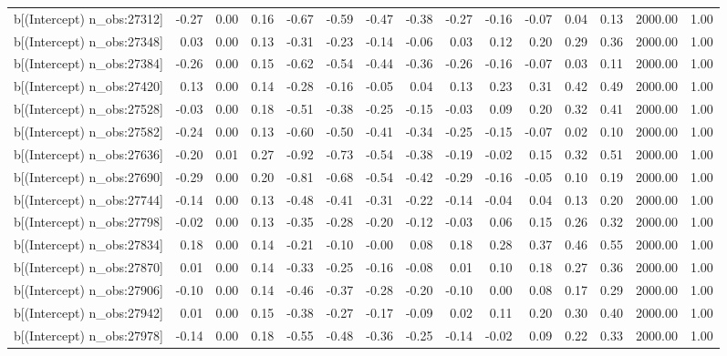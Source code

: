 \begin{table}[ht]
\begin{tabular}{rrrrrrrrrrrrrrr}
  b[(Intercept) n\_obs:27312] & -0.27 & 0.00 & 0.16 & -0.67 & -0.59 & -0.47 & -0.38 & -0.27 & -0.16 & -0.07 & 0.04 & 0.13 & 2000.00 & 1.00 \\ 
  b[(Intercept) n\_obs:27348] & 0.03 & 0.00 & 0.13 & -0.31 & -0.23 & -0.14 & -0.06 & 0.03 & 0.12 & 0.20 & 0.29 & 0.36 & 2000.00 & 1.00 \\ 
  b[(Intercept) n\_obs:27384] & -0.26 & 0.00 & 0.15 & -0.62 & -0.54 & -0.44 & -0.36 & -0.26 & -0.16 & -0.07 & 0.03 & 0.11 & 2000.00 & 1.00 \\ 
  b[(Intercept) n\_obs:27420] & 0.13 & 0.00 & 0.14 & -0.28 & -0.16 & -0.05 & 0.04 & 0.13 & 0.23 & 0.31 & 0.42 & 0.49 & 2000.00 & 1.00 \\ 
  b[(Intercept) n\_obs:27528] & -0.03 & 0.00 & 0.18 & -0.51 & -0.38 & -0.25 & -0.15 & -0.03 & 0.09 & 0.20 & 0.32 & 0.41 & 2000.00 & 1.00 \\ 
  b[(Intercept) n\_obs:27582] & -0.24 & 0.00 & 0.13 & -0.60 & -0.50 & -0.41 & -0.34 & -0.25 & -0.15 & -0.07 & 0.02 & 0.10 & 2000.00 & 1.00 \\ 
  b[(Intercept) n\_obs:27636] & -0.20 & 0.01 & 0.27 & -0.92 & -0.73 & -0.54 & -0.38 & -0.19 & -0.02 & 0.15 & 0.32 & 0.51 & 2000.00 & 1.00 \\ 
  b[(Intercept) n\_obs:27690] & -0.29 & 0.00 & 0.20 & -0.81 & -0.68 & -0.54 & -0.42 & -0.29 & -0.16 & -0.05 & 0.10 & 0.19 & 2000.00 & 1.00 \\ 
  b[(Intercept) n\_obs:27744] & -0.14 & 0.00 & 0.13 & -0.48 & -0.41 & -0.31 & -0.22 & -0.14 & -0.04 & 0.04 & 0.13 & 0.20 & 2000.00 & 1.00 \\ 
  b[(Intercept) n\_obs:27798] & -0.02 & 0.00 & 0.13 & -0.35 & -0.28 & -0.20 & -0.12 & -0.03 & 0.06 & 0.15 & 0.26 & 0.32 & 2000.00 & 1.00 \\ 
  b[(Intercept) n\_obs:27834] & 0.18 & 0.00 & 0.14 & -0.21 & -0.10 & -0.00 & 0.08 & 0.18 & 0.28 & 0.37 & 0.46 & 0.55 & 2000.00 & 1.00 \\ 
  b[(Intercept) n\_obs:27870] & 0.01 & 0.00 & 0.14 & -0.33 & -0.25 & -0.16 & -0.08 & 0.01 & 0.10 & 0.18 & 0.27 & 0.36 & 2000.00 & 1.00 \\ 
  b[(Intercept) n\_obs:27906] & -0.10 & 0.00 & 0.14 & -0.46 & -0.37 & -0.28 & -0.20 & -0.10 & 0.00 & 0.08 & 0.17 & 0.29 & 2000.00 & 1.00 \\ 
  b[(Intercept) n\_obs:27942] & 0.01 & 0.00 & 0.15 & -0.38 & -0.27 & -0.17 & -0.09 & 0.02 & 0.11 & 0.20 & 0.30 & 0.40 & 2000.00 & 1.00 \\ 
  b[(Intercept) n\_obs:27978] & -0.14 & 0.00 & 0.18 & -0.55 & -0.48 & -0.36 & -0.25 & -0.14 & -0.02 & 0.09 & 0.22 & 0.33 & 2000.00 & 1.00 \\ 

\end{tabular}
\end{table}
